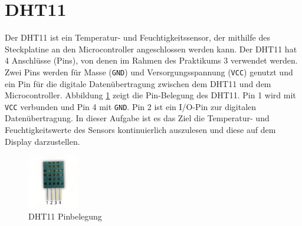 \section{\ExercisePrefixEmbeddedC DHT11 \optional}
Der DHT11 ist ein Temperatur- und Feuchtigkeitssensor, der mithilfe des Steckplatine an den Microcontroller angeschlossen werden kann.
Der DHT11 hat 4 Anschlüsse (Pins), von denen im Rahmen des Praktikums 3 verwendet werden.
Zwei Pins werden für Masse (\lstinline|GND|) und Versorgungsspannung (\lstinline|VCC|) genutzt und ein Pin für die digitale Datenübertragung zwischen dem DHT11 und dem Microcontroller.
Abbildung \ref{fig:dht11Pins} zeigt die Pin-Belegung des DHT11.
Pin 1 wird mit \lstinline|VCC| verbunden und Pin 4 mit \lstinline|GND|.
Pin 2 ist ein I/O-Pin zur digitalen Datenübertragung.
In dieser Aufgabe ist es das Ziel die Temperatur- und Feuchtigkeitswerte des Sensors kontinuierlich auszulesen und diese auf dem Display darzustellen.
\begin{figure}[!htb]
	\centering
	\includegraphics[width=0.2\textwidth]{./05_c/figures/DHT11.png}
	\caption{DHT11 Pinbelegung}
	\label{fig:dht11Pins}
\end{figure} 

